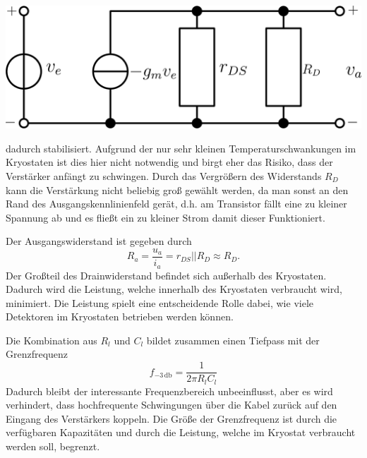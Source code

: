 \begin{minipage}[!b]{\textwidth}
\begin{minipage}[c]{0.6\textwidth}
\begin{minipage}[c]{0.5\textwidth}
\includegraphics[width=2\textwidth]{./fig/AmpEq.pdf}
\end{minipage}
\end{minipage}
\vspace{5mm}
\label{fig:Amp}
\end{minipage}
dadurch stabilisiert.
Aufgrund der nur sehr kleinen Temperaturschwankungen im Kryostaten ist dies hier nicht notwendig und birgt eher das Risiko, dass der Verstärker anfängt zu schwingen.
Durch das Vergrößern des Widerstands $R_D$ kann die Verstärkung nicht beliebig groß gewählt werden, da man sonst an den Rand des Ausgangskennlinienfeld gerät, d.h. am Transistor fällt eine zu kleiner Spannung ab und es fließt ein zu kleiner Strom damit dieser Funktioniert.

Der Ausgangswiderstand ist gegeben durch
\begin{equation}
R_a = \frac{u_a}{i_a} = r_{DS}||R_D \approx R_D.
\end{equation}
Der Großteil des Drainwiderstand befindet sich außerhalb des Kryostaten.
Dadurch wird die Leistung, welche innerhalb des Kryostaten verbraucht wird, minimiert.
Die Leistung spielt eine entscheidende Rolle dabei, wie viele Detektoren im Kryostaten betrieben werden können.

Die Kombination aus $R_l$ und $C_l$ bildet zusammen einen Tiefpass mit der Grenzfrequenz
\begin{equation}
f_{-3\,\mathrm{db}} = \frac{1}{2\pi R_l C_l}
\end{equation}
Dadurch bleibt der interessante Frequenzbereich unbeeinflusst, aber es wird verhindert, dass hochfrequente Schwingungen über die Kabel zurück auf den Eingang des Verstärkers koppeln.
Die Größe der Grenzfrequenz ist durch die verfügbaren Kapazitäten und durch die Leistung, welche im Kryostat verbraucht werden soll, begrenzt.

